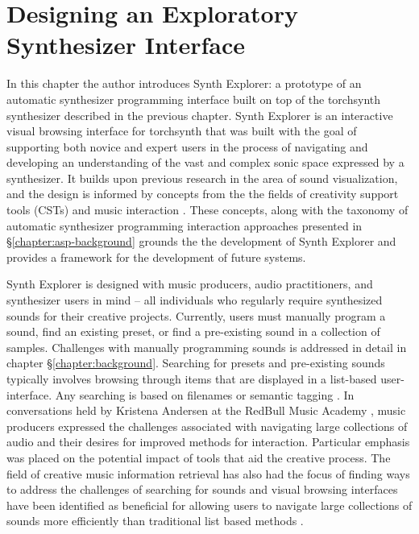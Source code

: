 \graphicspath{{./}{./figures/}{./figures/synthexplore/}}




\chapter{Designing an Exploratory Synthesizer Interface}
\label{chapter:synth-explore}

In this chapter the author introduces Synth Explorer: a prototype of an automatic synthesizer programming interface built on top of the torchsynth synthesizer described in the previous chapter. Synth Explorer is an interactive visual browsing interface for torchsynth that was built with the goal of supporting both novice and expert users in the process of navigating and developing an understanding of the vast and complex sonic space expressed by a synthesizer. It builds upon previous research in the area of sound visualization, and the design is informed by concepts from the the fields of creativity support tools (CSTs) and music interaction \cite{shneiderman2007creativity, holland2013music}. These concepts, along with the taxonomy of automatic synthesizer programming interaction approaches presented in \S\ref{chapter:asp-background} grounds the the development of Synth Explorer and provides a framework for the development of future systems. %

Synth Explorer is designed with music producers, audio practitioners, and synthesizer users in mind -- all individuals who regularly require synthesized sounds for their creative projects. Currently, users must manually program a sound, find an existing preset, or find a pre-existing sound in a collection of samples. Challenges with manually programming sounds is addressed in detail in chapter \S\ref{chapter:background}. Searching for presets and pre-existing sounds typically involves browsing through items that are displayed in a list-based user-interface. Any searching is based on filenames or semantic tagging \cite{knees2016searching}. In conversations held by Kristena Andersen at the RedBull Music Academy \cite{andersen2016conversations}, music producers expressed the challenges associated with navigating large collections of audio and their desires for improved methods for interaction. Particular emphasis was placed on the potential impact of tools that aid the creative process. The field of creative music information retrieval has also had the focus of finding ways to address the challenges of searching for sounds \cite{humphrey2013brief} and visual browsing interfaces have been identified as beneficial for allowing users to navigate large collections of sounds more efficiently than traditional list based methods \cite{turquois2016exploring}.

